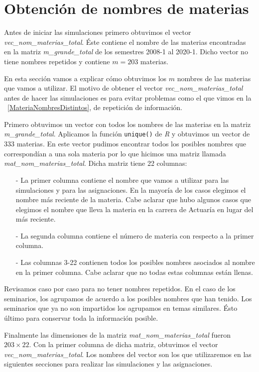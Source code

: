 \section{Obtención de nombres de materias}

Antes de iniciar las simulaciones primero obtuvimos el vector \textit{vec\_nom\_materias\_total}. Éste contiene el nombre de las materias encontradas en la matriz \textit{m\_grande\_total} de los semestres 2008-1 al 2020-1. Dicho vector  no tiene nombres repetidos y contiene $m = 203$ materias.

En esta sección vamos a explicar cómo obtuvimos los $m$ nombres de las materias que vamos a utilizar. El motivo de obtener el vector \textit{vec\_nom\_materias\_total} antes de hacer las simulaciones es para evitar problemas como el que vimos en la \figurename{~\ref{MateriaNombresDistintos}}, de repetición de información.

Primero obtuvimos un vector con todos los nombres de las materias en la matriz \textit{m\_grande\_total}. Aplicamos la función \verb+unique()+ de \textit{R} y obtuvimos un vector de 333 materias. En este vector pudimos encontrar todos los posibles nombres que correspondían a una sola materia por lo que hicimos una matriz llamada \textit{mat\_nom\_materias\_total}. Dicha matriz tiene 22 columnas:

\begin{itemize}
\item[-] La primer columna contiene el nombre que vamos a utilizar para las simulaciones y para las asignaciones. En la mayoría de los casos elegimos el nombre más reciente de la materia. Cabe aclarar que hubo algunos casos que elegimos el nombre que lleva la materia en la carrera de Actuaría en lugar del más reciente.

\item[-] La segunda columna contiene el número de materia con respecto a la primer columna.

\item[-] Las columnas 3-22 contienen todos los posibles nombres asociados al nombre en la primer columna. Cabe aclarar que no todas estas columnas están llenas.
\end{itemize}

Revisamos caso por caso para no tener nombres repetidos. En el caso de los seminarios, los agrupamos de acuerdo a los posibles nombres que han tenido. Los seminarios que ya no son impartidos los agrupamos en temas similares. Ésto último para conservar toda la información posible.

Finalmente las dimensiones de la matriz \textit{mat\_nom\_materias\_total} fueron $203 \times 22$. Con la primer columna de dicha matriz, obtuvimos el vector \textit{vec\_nom\_materias\_total}. Los nombres del vector son los que utilizaremos en las siguientes secciones para realizar las simulaciones y las asignaciones.
